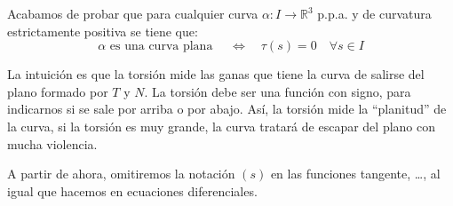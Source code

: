 \noindent
Acabamos de probar que para cualquier curva $\alpha:I\to \mathbb{R}^3$ p.p.a. y de curvatura estrictamente positiva se tiene que:
\begin{equation*}
    \alpha \text{\ es una curva plana\ } \quad\Longleftrightarrow\quad\tau(s) = 0 \quad \forall s\in I
\end{equation*}

\noindent
La intuición es que la torsión mide las ganas que tiene la curva de salirse del plano formado por $T$ y $N$. La torsión debe ser una función con signo, para indicarnos si se sale por arriba o por abajo. Así, la torsión mide la ``planitud'' de la curva, si la torsión es muy grande, la curva tratará de escapar del plano con mucha violencia.

\begin{notacion}
    A partir de ahora, omitiremos la notación $(s)$ en las funciones tangente, \ldots, al igual que hacemos en ecuaciones diferenciales.
\end{notacion}

